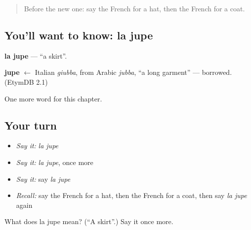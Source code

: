 \label{lesson:FR-C104-jupe}



\begin{quote}
Before the new one: say the French for a hat, then the French for a coat.
\end{quote}

\subsection*{You'll want to know: la jupe}
\textbf{la jupe} — \textquotedblleft{}a skirt\textquotedblright{}.

\begin{cousinweb}
\textbf{jupe} $\leftarrow$ Italian \emph{giubba}, from Arabic \emph{jubba}, \textquotedblleft{}a long garment\textquotedblright{} — borrowed. (EtymDB 2.1)
\end{cousinweb}

\begin{grammarlens}[title={What you've built}]
One more word for this chapter.
\end{grammarlens}

\subsection*{Your turn}
\begin{itemize}
\raggedright
  \item \emph{Say it:} \emph{la jupe}
  \item \emph{Say it:} \emph{la jupe}, once more
  \item \emph{Say it:} say \emph{la jupe}
  \item \emph{Recall:} say the French for a hat, then the French for a coat, then say \emph{la jupe} again
\end{itemize}

\begin{tcolorbox}[breakable,colback=teal!4,colframe=teal!35!black,title={Before you move on}]
What does la jupe mean? (\textquotedblleft{}A skirt\textquotedblright{}.) Say it once more.
\end{tcolorbox}
